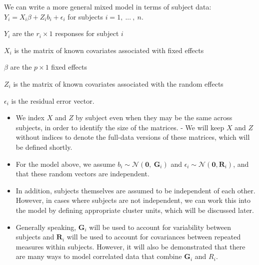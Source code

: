 \documentclass[
  9pt,
  ignorenonframetext,
]{beamer}
\providecommand{\tightlist}{%
  \setlength{\itemsep}{0pt}\setlength{\parskip}{0pt}}
\begin{document}
\begin{frame}{}
\protect\hypertarget{section}{}
\begin{block}{We can write a more general mixed model in terms of
subject data:}
\protect\hypertarget{we-can-write-a-more-general-mixed-model-in-terms-of-subject-data}{}
\(Y_i = X_i \beta + Z_ib_i + \epsilon_i\) for subjects
\(i = 1,\ ...\ ,\ n\).

\(Y_i\) are the \(r_i \times 1\) responses for subject \(i\)

\(X_i\) is the matrix of known covariates associated with fixed effects

\(\beta\) are the \(p \times 1\) fixed effects

\(Z_i\) is the matrix of known covariates associated with the random
effects

\(\epsilon_i\) is the residual error vector.

\begin{itemize}
\tightlist
\item
  We index \(X\) and \(Z\) by subject even when they may be the same
  across subjects, in order to identify the size of the matrices. - We
  will keep \(X\) and \(Z\) without indices to denote the full-data
  versions of these matrices, which will be defined shortly.
\end{itemize}
\end{block}
\end{frame}

\begin{frame}{}
\protect\hypertarget{section-1}{}
\begin{itemize}
\item
  For the model above, we assume
  \(b_i \sim \mathcal N(\pmb0,\ \pmb G_i)\) and
  \(\epsilon_i \sim \mathcal N(\pmb 0, \pmb R_i)\), and that these
  random vectors are independent.
\item
  In addition, subjects themselves are assumed to be independent of each
  other. However, in cases where subjects are not independent, we can
  work this into the model by defining appropriate cluster units, which
  will be discussed later.
\item
  Generally speaking, \(\pmb G_i\) will be used to account for
  variability between subjects and \(\pmb R_i\) will be used to account
  for covariances between repeated measures within subjects. However, it
  will also be demonstrated that there are many ways to model correlated
  data that combine \(\pmb G_i\) and \(R_i\).
\end{itemize}
\end{frame}
\end{document}
